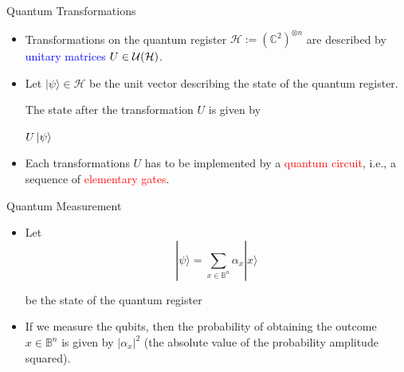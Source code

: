 \documentclass[slideColor]{prosper}
\renewcommand{\>}{\rangle}
\newcommand{\<}{\langle}
\newcommand{\C}{{\mathbb C}}
\newcommand{\cH}{{\mathcal H}}
\begin{document}

\begin{slide}{Quantum Transformations}

\begin{itemize}
\item Transformations on the quantum register $\cH:=(\C^2)^{\otimes n}$ are
described by \textcolor{blue}{unitary matrices} $U\in {\cal U}(\cH)$.

\bigskip
\item Let $|\psi\>\in\cH$ be the unit vector
describing the state of the quantum register.

\medskip

\bigskip
The state after the transformation $U$ is given by

\medskip
\begin{center}
{\large $U \left\vert{\psi}\right\rangle$}
\end{center}

\bigskip
\item Each transformations $U$ has to be implemented by a \textcolor{red}{quantum circuit}, i.e., a sequence of
\textcolor{red}{elementary gates}.
\end{itemize}
\end{slide}


\begin{slide}{Quantum Measurement}

\begin{itemize}
\item Let
\[
|\psi\> = \sum_{x\in\mathbb{B}^n}\alpha_x |x\>
\]

\medskip
be the state of the quantum register


\medskip

\bigskip
\item If we measure the qubits, then the probability of obtaining the outcome
$x\in\mathbb{B}^n$ is given by $|\alpha_x|^2$ (the absolute value of the probability amplitude squared).
\end{itemize}
\end{slide}

\end{document}
